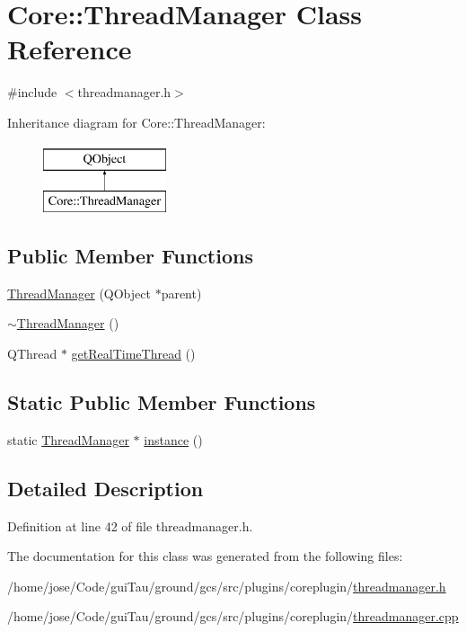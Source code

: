 \hypertarget{class_core_1_1_thread_manager}{\section{Core\-:\-:Thread\-Manager Class Reference}
\label{class_core_1_1_thread_manager}
}


{\ttfamily \#include $<$threadmanager.\-h$>$}

Inheritance diagram for Core\-:\-:Thread\-Manager\-:\begin{figure}[H]
\begin{center}
\leavevmode
\includegraphics[height=2.000000cm]{class_core_1_1_thread_manager}
\end{center}
\end{figure}
\subsection*{Public Member Functions}
\begin{DoxyCompactItemize}
\item 
\hyperlink{group___core_plugin_ga4695f2194bf91085621507eddc07e314}{Thread\-Manager} (Q\-Object $\ast$parent)
\item 
\hyperlink{group___core_plugin_ga18eb12d3d752075318c3672c8efffd5b}{$\sim$\-Thread\-Manager} ()
\item 
Q\-Thread $\ast$ \hyperlink{group___core_plugin_ga49136d4285faaba80634919c6ebba8fc}{get\-Real\-Time\-Thread} ()
\end{DoxyCompactItemize}
\subsection*{Static Public Member Functions}
\begin{DoxyCompactItemize}
\item 
static \hyperlink{class_core_1_1_thread_manager}{Thread\-Manager} $\ast$ \hyperlink{group___core_plugin_gae7f841ce9120f38b646d3fb68823c871}{instance} ()
\end{DoxyCompactItemize}


\subsection{Detailed Description}


Definition at line 42 of file threadmanager.\-h.



The documentation for this class was generated from the following files\-:\begin{DoxyCompactItemize}
\item 
/home/jose/\-Code/gui\-Tau/ground/gcs/src/plugins/coreplugin/\hyperlink{threadmanager_8h}{threadmanager.\-h}\item 
/home/jose/\-Code/gui\-Tau/ground/gcs/src/plugins/coreplugin/\hyperlink{threadmanager_8cpp}{threadmanager.\-cpp}\end{DoxyCompactItemize}
